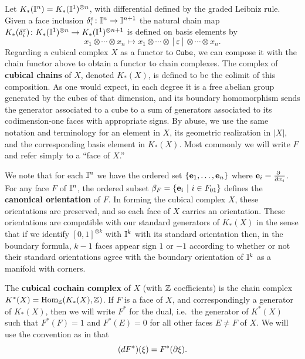 Let $K_*(\mathbb{I}^n) = K_*(\mathbb{I}^1)^{ \otimes n}$, with differential defined by the graded Leibniz rule.
Given a face inclusion $\delta_i^{\varepsilon} \colon \mathbb{I}^n \to \mathbb{I}^{n+1}$ the natural chain map $K_*(\delta_i^{\varepsilon}) \colon K_*(\mathbb{I}^1)^{ \otimes n} \to K_*(\mathbb{I}^1)^{ \otimes n+1}$ is defined on basis elements by
\begin{equation*}
x_1 \otimes \cdots \otimes x_n \mapsto
x_1 \otimes \cdots \otimes [\underline{\varepsilon}] \otimes \cdots \otimes x_n.
\end{equation*}
Regarding a cubical complex $X$ as a functor to $\mathtt{Cube}$, we can compose it with the chain functor above to obtain a functor to chain complexes.
The complex of \textbf{cubical chains} of $X$, denoted $K_*(X)$, is defined to be the colimit of this composition.
As one would expect, in each degree it is a free abelian group generated by the cubes of that dimension, and its boundary homomorphism sends the
generator associated to a cube to a sum of generators associated to its codimension-one faces with appropriate signs. By abuse, we use the same notation and terminology for an element in $X$, its geometric realization in $|X|$,
and the corresponding basis element in $K_*(X)$. Most commonly we will write $F$ and refer simply to a ``face of $X$.''

We note that for each $\mathbb{I}^n$ we have the ordered set $\{\mathbf{e}_1, \dots, \mathbf{e}_n\}$ where $\mathbf{e}_i = \frac{\partial\ }{\partial x_i}$.
For any face $F$ of $\mathbb{I}^n$, the ordered subset $\beta_F = \{\mathbf{e}_i\ |\ i \in F_{01}\}$ defines the \textbf{canonical orientation} of $F$. In forming the cubical complex $X$, these orientations are preserved, and so each face of $X$ carries an orientation. These orientations are compatible with our standard generators of $K_*(X)$ in the sense that if we identify $[0,1]^{ \otimes k}$ with $\mathbb{I}^k$ with its standard orientation then, in the boundary formula, $k-1$ faces appear sign $1$ or $-1$ according to whether or not their standard orientations agree with the boundary orientation of $\mathbb{I}^k$ as a manifold with corners.




The \textbf{cubical cochain complex} of $X$ (with $\mathbb{Z}$ coefficients) is the chain complex $K^*(X) = \textup{Hom}_{\mathbb{Z}}(K_*(X), \mathbb{Z})$. If $F$ is a face of $X$, and correspondingly a generator of $K_*(X)$, then we will write $F^*$ for the dual, i.e.\ the generator of $K^*(X)$ such that $F^*(F) = 1$ and $F^*(E) = 0$ for all other faces $E\neq F$ of $X$. We will use the convention as in \cite{Mun84} that
$$(dF^*)(\xi) = F^*(\partial \xi).$$





